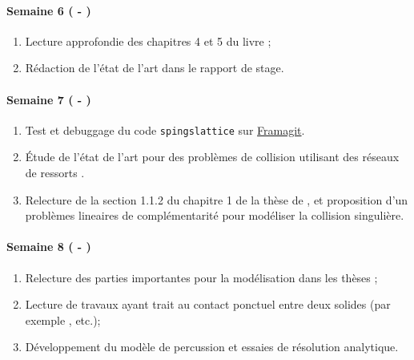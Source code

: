 \paragraph{Semaine 6 ( - )} 
\begin{enumerate}
    \item Lecture approfondie des chapitres 4 et 5 du livre \parencite{balasoiu2020halthesis};
    \item Rédaction de l'\/état de l'\/art dans le rapport de stage. 
\end{enumerate}
  

\paragraph{Semaine 7 ( - )} 

\begin{enumerate}
    \item Test et debuggage du code \verb|spingslattice| sur \href{https://framagit.org/RaK/SimuRessorts}{Framagit}. 
    \item Étude de l'état de l'art pour des problèmes de collision utilisant des réseaux de ressorts \parencite{islam2020numerical,gerivani2019proposing,homodeling,manea2021simplified}.
    \item Relecture de la section 1.1.2 du chapitre 1 de la thèse de \citeauthor{rabatel2015thesis} \parencite[p.18]{rabatel2015thesis}, et proposition d'un problèmes lineaires de complémentarité pour modéliser la collision singulière.
  \end{enumerate}


\paragraph{Semaine 8 ( - )} 
\begin{enumerate}
    \item Relecture des parties importantes pour la modélisation dans les thèses \parencite{balasoiu2020halthesis,rabatel2015thesis};
    \item Lecture de travaux ayant trait au contact ponctuel entre deux solides (par exemple \parencite{lotstedt1981coulomb}, etc.);
    \item Développement du modèle de percussion et essaies de résolution analytique. 
\end{enumerate}
  

